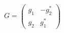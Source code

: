 \begin{equation}
G= \left(
\begin{array}{cc}
g_{1} & -g_{2}^{\ast}\\
g_{2} & g_{1}^{\ast}
\end{array}
\right)
\end{equation}

